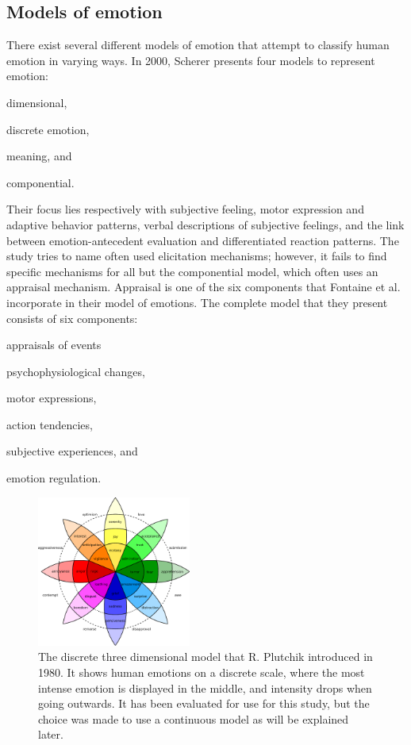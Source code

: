 \documentclass{sigchi}
\begin{document}
\subsection{Models of emotion} %
\label{sub:models_of_emotion}
There exist several different models of emotion that attempt to classify human emotion in varying ways. In 2000, Scherer \cite{scherer2000} presents four models to represent emotion:
\begin{enumerate*}[label=(\alph*)]
  \item dimensional,
  \item discrete emotion,
  \item meaning, and
  \item componential.
\end{enumerate*}
Their focus lies respectively with subjective feeling, motor expression and adaptive behavior patterns, verbal descriptions of subjective feelings, and the link between emotion-antecedent evaluation and differentiated reaction patterns. The study tries to name often used elicitation mechanisms; however, it fails to find specific mechanisms for all but the componential model, which often uses an appraisal mechanism. Appraisal is one of the six components that Fontaine et al. \cite{Fontaine2007} incorporate in their model of emotions. The complete model that they present consists of six components:
\begin{enumerate*}[label=(\alph*)]
  \item appraisals of events
  \item psychophysiological changes,
  \item motor expressions,
  \item action tendencies,
  \item subjective experiences, and
  \item emotion regulation.
\end{enumerate*}

\begin{figure}[t]
    \centering
    \includegraphics[width=0.45\textwidth]{images/PlutchikWheelOfEmotions.eps}
    \caption{The discrete three dimensional model that R. Plutchik \protect\cite{Plutchik1980} introduced in 1980. It shows human emotions on a discrete scale, where the most intense emotion is displayed in the middle, and intensity drops when going outwards. It has been evaluated for use for this study, but the choice was made to use a continuous model as will be explained later.}
    \label{fig:wheel_of_emotions}
\end{figure}
\end{document}
